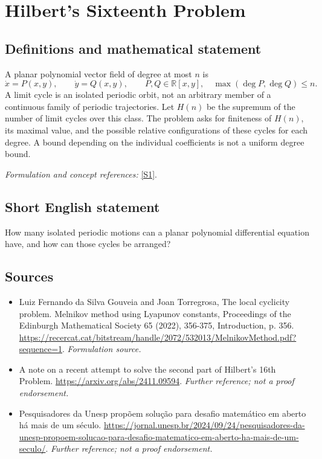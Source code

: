 \documentclass[11pt]{article}
\begin{document}
\section*{\texorpdfstring{Hilbert's Sixteenth Problem}{Hilbert's Sixteenth Problem}}\label{1162}
\subsection{Definitions and mathematical statement}
A planar polynomial vector field of degree at most $n$ is
\[
 \dot x=P(x,y),\qquad\dot y=Q(x,y),\qquad P,Q\in{\mathbb{R}}[x,y],\quad\max(\deg P,\deg Q)\le n.
\]
A limit cycle is an isolated periodic orbit, not an arbitrary member of a continuous family of periodic trajectories. Let $H(n)$ be the supremum of the number of limit cycles over this class. The problem asks for finiteness of $H(n)$, its maximal value, and the possible relative configurations of these cycles for each degree. A bound depending on the individual coefficients is not a uniform degree bound.
\par\smallskip\textit{Formulation and concept references:} \href{https://recercat.cat/bitstream/handle/2072/532013/MelnikovMethod.pdf?sequence=1}{[S1]}.

\subsection{Short English statement}
How many isolated periodic motions can a planar polynomial differential equation have, and how can those cycles be arranged?
\subsection{Sources}
\begin{itemize}
\item[S1]Luiz Fernando da Silva Gouveia and Joan Torregrosa, The local cyclicity problem. Melnikov method using Lyapunov constants, Proceedings of the Edinburgh Mathematical Society 65 (2022), 356-375, Introduction, p. 356.
\url{https://recercat.cat/bitstream/handle/2072/532013/MelnikovMethod.pdf?sequence=1}.
\textit{Formulation source.}
\item[S2]A note on a recent attempt to solve the second part of Hilbert's 16th Problem.
\url{https://arxiv.org/abs/2411.09594}.
\textit{Further reference; not a proof endorsement.}
\item[S3]Pesquisadores da Unesp propõem solução para desafio matemático em aberto há mais de um século.
\url{https://jornal.unesp.br/2024/09/24/pesquisadores-da-unesp-propoem-solucao-para-desafio-matematico-em-aberto-ha-mais-de-um-seculo/}.
\textit{Further reference; not a proof endorsement.}
\end{itemize}
\end{document}
